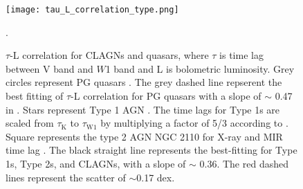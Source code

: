 \begin{figure}
\centering
	\texttt{[image: tau\_L\_correlation\_type.png]}
    \caption{$\tau$-L correlation for CLAGNs and quasars, where $\tau$ is time lag between V band and $W$1 band and L is bolometric luminosity. Grey circles represent PG quasars \citep{2019ApJ...886...33L}. The grey dashed line repserent the best fitting of $\tau$-L correlation for PG quasars with a slope of $\sim$ 0.47 in \citet{2019ApJ...886...33L}.
    Stars represent Type 1 AGN \citep[][]{2014ApJ...788..159K,2019ApJ...886...33L}. The time lags for Type 1s are scaled from $\tau_\mathrm{K}$ to $\tau_\mathrm{W1}$ by multiplying a factor of 5/3 according to \citet[][]{2019ApJ...886...33L}. Square represents the type 2 AGN NGC 2110 for X-ray and MIR time lag \citep[see ][]{2020MNRAS.495.2921N}. The black straight line represents the best-fitting for Type 1s, Type 2s, and CLAGNs, with a slope of $\sim$ 0.36. The red dashed lines represent the scatter of $\sim$0.17 dex.  }
    \label{fig:tau_L}. 
\end{figure}


